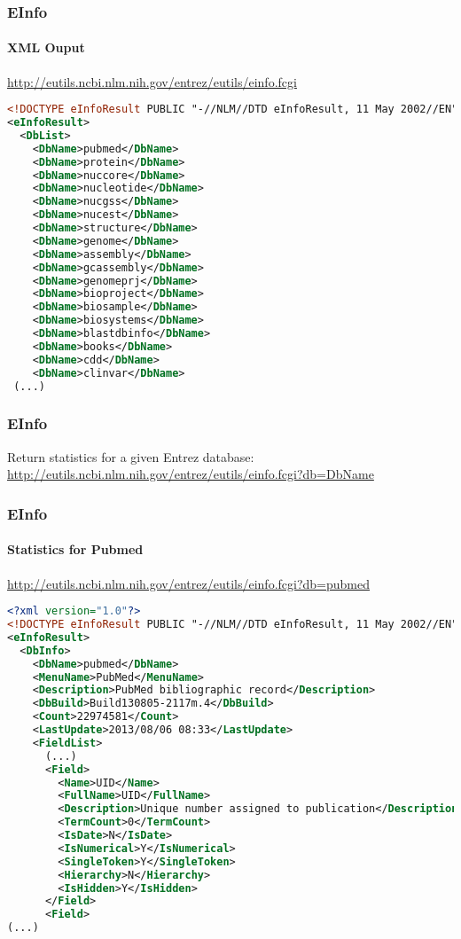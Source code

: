\documentclass{beamer}
\begin{document}
\begin{frame}[fragile]
\frametitle{EInfo}
\framesubtitle{XML Ouput}

\url{http://eutils.ncbi.nlm.nih.gov/entrez/eutils/einfo.fcgi}

\small
\begin{lstlisting}[language=xml]
<!DOCTYPE eInfoResult PUBLIC "-//NLM//DTD eInfoResult, 11 May 2002//EN" "http://www.ncbi.nlm.nih.gov/entrez/query/DTD/eInfo_020511.dtd">
<eInfoResult>
  <DbList>
    <DbName>pubmed</DbName>
    <DbName>protein</DbName>
    <DbName>nuccore</DbName>
    <DbName>nucleotide</DbName>
    <DbName>nucgss</DbName>
    <DbName>nucest</DbName>
    <DbName>structure</DbName>
    <DbName>genome</DbName>
    <DbName>assembly</DbName>
    <DbName>gcassembly</DbName>
    <DbName>genomeprj</DbName>
    <DbName>bioproject</DbName>
    <DbName>biosample</DbName>
    <DbName>biosystems</DbName>
    <DbName>blastdbinfo</DbName>
    <DbName>books</DbName>
    <DbName>cdd</DbName>
    <DbName>clinvar</DbName>
 (...)
\end{lstlisting}
\end{frame}


\begin{frame}[fragile]
\frametitle{EInfo}
Return statistics for a given Entrez database:\\
\small
\url{http://eutils.ncbi.nlm.nih.gov/entrez/eutils/einfo.fcgi?db=DbName}
\end{frame}


\begin{frame}[fragile]
\frametitle{EInfo}
\framesubtitle{Statistics for Pubmed}
\url{http://eutils.ncbi.nlm.nih.gov/entrez/eutils/einfo.fcgi?db=pubmed}
\begin{lstlisting}[language=xml,basicstyle=\tiny,breaklines=false]
<?xml version="1.0"?>
<!DOCTYPE eInfoResult PUBLIC "-//NLM//DTD eInfoResult, 11 May 2002//EN" "http://www.ncbi.nlm.nih.gov/entrez/query/DTD/eInfo_020511.dtd">
<eInfoResult>
  <DbInfo>
    <DbName>pubmed</DbName>
    <MenuName>PubMed</MenuName>
    <Description>PubMed bibliographic record</Description>
    <DbBuild>Build130805-2117m.4</DbBuild>
    <Count>22974581</Count>
    <LastUpdate>2013/08/06 08:33</LastUpdate>
    <FieldList>
      (...)
      <Field>
        <Name>UID</Name>
        <FullName>UID</FullName>
        <Description>Unique number assigned to publication</Description>
        <TermCount>0</TermCount>
        <IsDate>N</IsDate>
        <IsNumerical>Y</IsNumerical>
        <SingleToken>Y</SingleToken>
        <Hierarchy>N</Hierarchy>
        <IsHidden>Y</IsHidden>
      </Field>
      <Field>
(...)
\end{lstlisting}
\end{frame}
\end{document}
